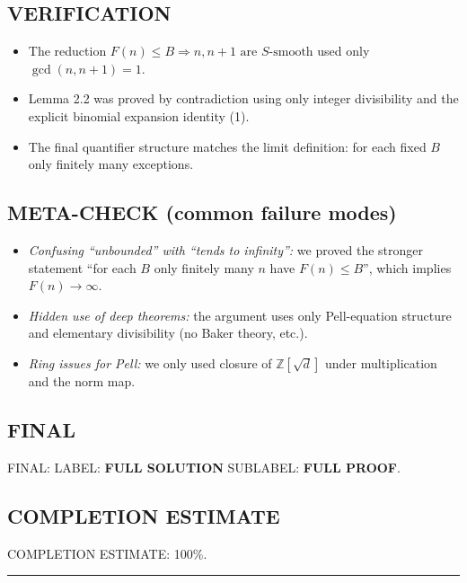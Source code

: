 \subsection*{VERIFICATION}
\begin{itemize}
\item The reduction $F(n)\le B\Rightarrow n,n+1\text{ are }S\text{-smooth}$ used only $\gcd(n,n+1)=1$.
\item Lemma 2.2 was proved by contradiction using only integer divisibility and the explicit binomial expansion identity (1).
\item The final quantifier structure matches the limit definition: for each fixed $B$ only finitely many exceptions.
\end{itemize}

\subsection*{META-CHECK (common failure modes)}
\begin{itemize}
\item \emph{Confusing ``unbounded'' with ``tends to infinity'':} we proved the stronger statement ``for each $B$ only finitely many $n$ have $F(n)\le B$'', which implies $F(n)\to\infty$.
\item \emph{Hidden use of deep theorems:} the argument uses only Pell-equation structure and elementary divisibility (no Baker theory, etc.).
\item \emph{Ring issues for Pell:} we only used closure of $\mathbb{Z}[\sqrt d]$ under multiplication and the norm map.
\end{itemize}

\subsection*{FINAL}
FINAL: LABEL: \textbf{FULL SOLUTION} \quad SUBLABEL: \textbf{FULL PROOF}.

\subsection*{COMPLETION ESTIMATE}
COMPLETION ESTIMATE: 100\%.

\hrule

